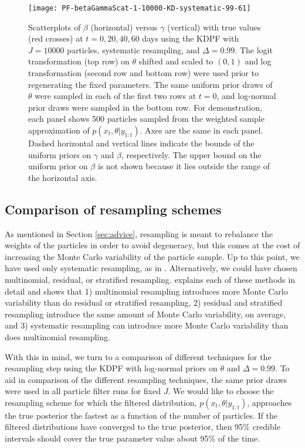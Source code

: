 \documentclass{elsarticle}
\begin{document}
\begin{figure}
\centering
\begin{minipage}{1.0\linewidth}
\texttt{[image: PF-betaGammaScat-1-10000-KD-systematic-99-61]}
\caption{Scatterplots of $\beta$ (horizontal) versus $\gamma$ (vertical) with true values (red crosses) at $t = 0, 20, 40, 60$ days using the KDPF with $J = 10000$ particles, systematic resampling, and $\Delta = 0.99$. The logit transformation (top row) on $\theta$ shifted and scaled to $(0,1)$ and log transformation (second row and bottom row) were used prior to regenerating the fixed parameters. The same uniform prior draws of $\theta$ were sampled in each of the first two rows at $t = 0$, and log-normal prior draws were sampled in the bottom row. For demonstration, each panel shows 500 particles sampled from the weighted sample approximation of $p(x_t,\theta|y_{1:t})$. Axes are the same in each panel. Dashed horizontal and vertical lines indicate the bounds of the uniform priors on $\gamma$ and $\beta$, respectively. The upper bound on the uniform prior on $\beta$ is not shown because it lies outside the range of the horizontal axis.} \label{fig:priors}
\end{minipage}
\end{figure}

\subsection{Comparison of resampling schemes \label{sec:resample}}

As mentioned in Section \ref{sec:advice}, resampling is meant to rebalance the weights of the particles in order to avoid degeneracy, but this comes at the cost of increasing the Monte Carlo variability of the particle sample. Up to this point, we have used only systematic resampling, as in \citet{skvortsov2012monitoring}. Alternatively, we could have chosen multinomial, residual, or stratified resampling. \citet{Douc:Capp:Moul:comp:2005} explains each of these methods in detail and shows that 1) multinomial resampling introduces more Monte Carlo variability than do residual or stratified resampling, 2) residual and stratified resampling introduce the same amount of Monte Carlo variability, on average, and 3) systematic resampling can introduce more Monte Carlo variability than does multinomial resampling.

With this in mind, we turn to a comparison of different techniques for the resampling step using the KDPF with log-normal priors on $\theta$ and $\Delta = 0.99$. To aid in comparison of the different resampling techniques, the same prior draws were used in all particle filter runs for fixed $J$. We would like to choose the resampling scheme for which the filtered distribution, $p(x_t,\theta|y_{1:t})$, approaches the true posterior the fastest as a function of the number of particles. If the filtered distributions have converged to the true posterior, then 95\% credible intervals should cover the true parameter value about 95\% of the time.
\end{document}
